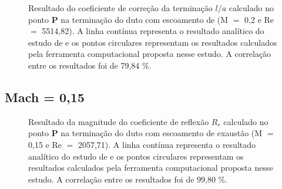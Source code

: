 \newpage
\begin{figure}[ht!]
\centering
  \caption[Coeficiente de Correção da Terminação $l/a$ com Escoamento de Exaustão (M $=$ 0,2)]{Resultado do coeficiente de correção da terminação $l/a$ calculado no ponto $\textbf{P}$ na terminação do duto com escoamento de (M $=$ 0,2 e Re $=$ 5514,82). A linha contínua representa o resultado analítico do estudo de  e os pontos circulares representam os resultados calculados pela ferramenta computacional proposta nesse estudo. A correlação entre os resultados foi de 79,84 \%.}
  \label{fig:loa_boca_020}
\end{figure}

\newpage
\subsection{Mach = 0,15}

\begin{figure}[ht!]
\centering
  \caption[Coeficiente de Reflexão $R_{r}$ com Escoamento de Exaustão (M $=$ 0,15)]{Resultado da magnitude do coeficiente de reflexão $R_{r}$ calculado no ponto $\textbf{P}$ na terminação do duto com escoamento de exaustão (M $=$ 0,15 e Re $=$ 2057,71). A linha contínua representa o resultado analítico do estudo de  e os pontos circulares representam os resultados calculados pela ferramenta computacional proposta nesse estudo. A correlação entre os resultados foi de 99,80 \%.}
  \label{fig:abs_r_boca_015}
\end{figure}

